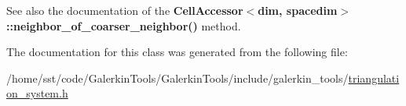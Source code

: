 See also the documentation of the {\bf Cell\+Accessor$<$dim, spacedim$>$\+::neighbor\+\_\+of\+\_\+coarser\+\_\+neighbor()} method. 

The documentation for this class was generated from the following file\+:\begin{DoxyCompactItemize}
\item 
/home/sst/code/\+Galerkin\+Tools/\+Galerkin\+Tools/include/galerkin\+\_\+tools/\hyperlink{triangulation__system_8h}{triangulation\+\_\+system.\+h}\end{DoxyCompactItemize}

